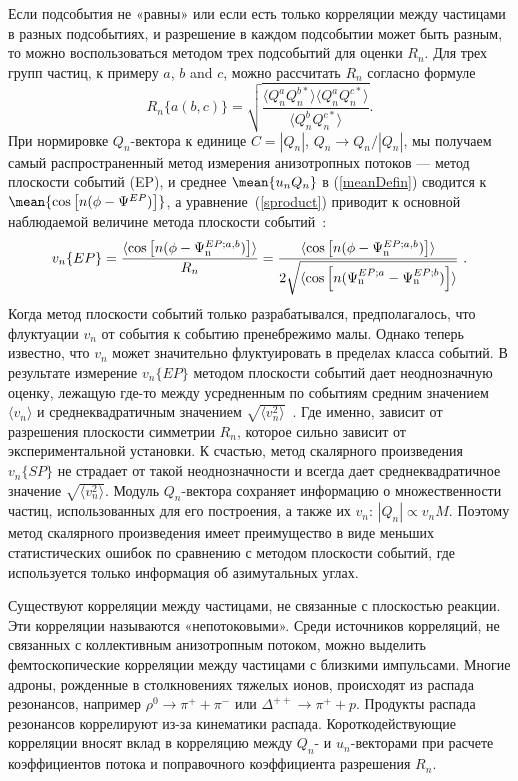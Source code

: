 Если подсобытия не «равны» или если есть только корреляции между частицами в разных подсобытиях,
и разрешение в каждом подсобытии может быть разным, то можно  воспользоваться методом трех подсобытий для оценки $R_n$. 
Для трех групп частиц, к примеру $a$, $b$ and $c$, можно рассчитать $R_n$ согласно формуле
%
\begin{equation}
    R_n\{a(b,c)\} = \sqrt{ \frac{  \langle Q_n^a Q_n^{b*} \rangle \langle Q_n^a Q_n^{c*} \rangle }{  \langle Q_n^b Q_n^{c*} \rangle } }.
    \label{eq:r1_3sub}
\end{equation}
%
При нормировке $Q_n$-вектора к единице $C=|Q_n|$,  $Q_n \rightarrow Q_n/|Q_n|$,
мы получаем самый распространенный метод измерения анизотропных потоков --- метод плоскости событий (EP), и 
среднее $\mean{u_n Q_n}$ в (\ref{meanDefin}) сводится к $\mean{\cos \left[ n (\phi -\Psi^{EP})\right]}$, а уравнение~(\ref{sproduct}) приводит к основной наблюдаемой величине метода плоскости событий~\cite{Poskanzer:1998yz}:
%
\begin{eqnarray}
\label{standardMethod}
v_n\{EP\} = \frac{ \langle {\cos\left[n(\phi-\Psi_{\rm n}^{EP;a,b})\right]} \rangle }
{R_n} = \frac{\langle {\cos\left[n(\phi-\Psi_{\rm n}^{EP;a,b})\right]} \rangle }
{2 \sqrt{\langle {\cos\left[ n(\Psi_{\rm n}^{EP;a} - \Psi_{\rm n}^{EP;b})\right]} \rangle }}\ .
\end{eqnarray}
%
Когда метод плоскости событий только разрабатывался, предполагалось, что флуктуации $v_n$ от события к событию пренебрежимо малы. 
Однако теперь известно, что $v_n$ может значительно флуктуировать в пределах класса событий. 
В результате измерение $v_n\{EP\}$ методом плоскости событий дает неоднозначную оценку, лежащую где-то между усредненным по событиям средним значением $\langle v_n \rangle$ и среднеквадратичным значением $\sqrt{ \langle v_n^2 \rangle }$~\cite{Borghini:2001vi, Bhalerao:2006tp}. 
Где именно, зависит от разрешения плоскости симметрии $R_n$, которое сильно зависит от экспериментальной установки.
К счастью, метод скалярного произведения  $v_n\{SP\}$ не страдает от такой неоднозначности и всегда дает среднеквадратичное значение  $\sqrt{ \langle v_n^2 \rangle }$. 
Модуль $Q_n$-вектора сохраняет информацию о множественности частиц, использованных для его построения, а также их $v_n$: $|Q_n| \propto v_n M$.
Поэтому метод скалярного произведения имеет преимущество в виде меньших статистических ошибок по сравнению с методом плоскости событий, где используется только информация об азимутальных углах.

Существуют  корреляции между частицами, не связанные с плоскостью реакции. 
Эти корреляции называются «непотоковыми». 
Среди источников корреляций, не связанных с коллективным анизотропным потоком, можно выделить фемтоскопические корреляции между частицами с близкими импульсами.
Многие адроны, рожденные в столкновениях тяжелых ионов, происходят из распада резонансов, например $\rho^0 \rightarrow \pi^+ + \pi^-$  или $\Delta^{++} \rightarrow \pi^+ + p$. 
Продукты распада резонансов коррелируют из-за кинематики распада. 
Короткодействующие корреляции вносят вклад в корреляцию между $Q_n$- и $u_n$-векторами при расчете
коэффициентов потока и поправочного коэффициента разрешения $R_n$. 

